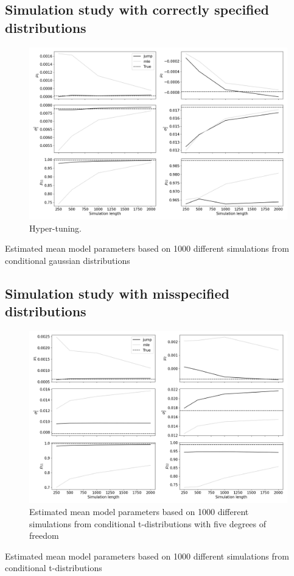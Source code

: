 \subsection{Simulation study with correctly specified distributions}

\begin{figure}[H] 
    \centering
    \includegraphics[width=1\textwidth]{analysis/model_convergence/images/simulation_normal.png}
    \caption{Hyper-tuning.}
    \label{fig:jump_penalties}
\end{figure}

\begin{table}[H]
\centering
\caption{Estimated mean model parameters based on 1000 different simulations from conditional gaussian distributions}

\end{table}

 
\subsection{Simulation study with misspecified distributions}

\begin{figure}[H] 
    \centering
    \includegraphics[width=1\textwidth]{analysis/model_convergence/images/simulation_t.png}
    \caption{Estimated mean model parameters based on 1000 different simulations from conditional t-distributions with five degrees of freedom}
    \label{fig:jump_penalties}
\end{figure}

\begin{table}[H]
\centering
\caption{Estimated mean model parameters based on 1000 different simulations from conditional t-distributions}

\end{table}